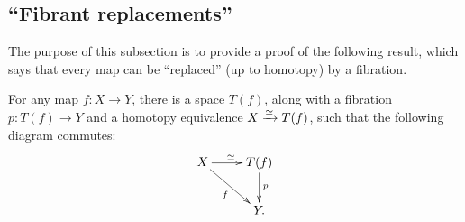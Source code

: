 \subsection{``Fibrant replacements''}
The purpose of this subsection is to provide a proof of the following result, which says that every map can be ``replaced''
(up to homotopy) by a fibration.
\begin{theorem}\label{fibrep}
    For any map $f:X\to Y$, there is a space $T(f)$, along with a fibration $p:T(f) \to Y$ and
    a homotopy equivalence $X \xrightarrow{{\simeq}} T(f)$, such that the following diagram
    commutes:
    \begin{equation*}
	\xymatrix{
	    X\ar[r]^{\simeq}\ar[dr]_f & T(f)\ar[d]^p\\
	    & Y.
	    }
    \end{equation*}
\end{theorem}
